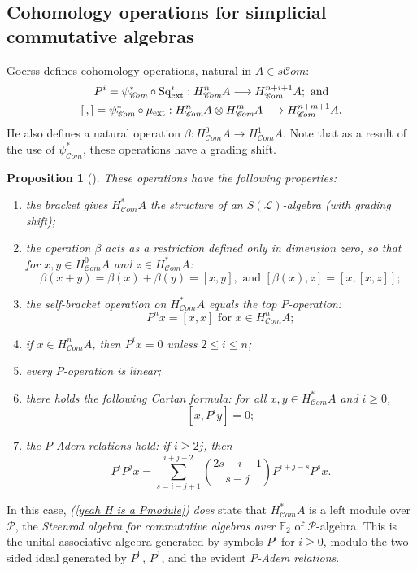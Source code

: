 \documentclass[11pt]{amsart} \renewcommand{\baselinestretch}{1.2}
\theoremstyle{plain}
\newtheorem{prop}[thm]{Proposition}
\theoremstyle{definition}
\renewcommand{\to}{\longrightarrow}
\newcommand{\scrL}{\mathscr{L}}
\newcommand{\scrC}{\mathscr{C}}
\newcommand{\calP}{\mathcal{P}}
\newcommand{\citeBOX}[2][]{\cite[\mbox{#1}]{#2}}
\newcommand{\Palg}{{\calP}}
\newcommand{\LieOperad}{{\scrL}}
\newcommand{\ExtCohOp}{\mathrm{Sq}_\mathrm{ext}}
\newcommand{\ExtCohProd}{\mu_\mathrm{ext}}
\newcommand{\F}{\mathbb{F}}
\newcommand{\algs}{{\scrC\!\textit{om}}}
\newcommand{\Ftwo}{\F_2}
\begin{document}
\begin{Constructing cohomology operations}
\subsection{Cohomology operations for simplicial commutative algebras}
\label{The example of simplicial commutative F2-algebras}
Goerss \citeBOX[\S5]{MR1089001} defines cohomology operations, natural in $A\in s \algs$:
\begin{gather*}
P^i=\psi^*_{\algs}\circ\ExtCohOp^i:H^n_{\algs}A\to H_{\algs}^{n+i+1}A;\textup{ and}\\
[\,,]=\psi^*_{\algs}\circ\ExtCohProd :H_{\algs}^nA\otimes H_{\algs}^mA\to H_{\algs}^{n+m+1}A.
\end{gather*}
He also defines a natural operation $\beta:H_{\algs}^0A\to H_{\algs}^1A$. Note that as a result of the use of $\psi^*_{\algs}$, these operations have a grading shift.
\begin{prop}[{\citeBOX[\S5]{MR1089001}}]
\label{omnibus on coh of simp algs}These operations have the following properties:
\begin{enumerate}
\item the bracket gives $H^*_{\algs}A$ the structure of an $S(\LieOperad)$-algebra (with grading shift);
\item the operation $\beta$ acts as a restriction defined only in dimension zero, so that for $x,y\in H^0_{\algs}A$ and $z\in H^*_{\algs}A$:
\[\beta(x+y)=\beta(x)+\beta(y)=[x,y],\text{\ \ and \ }[\beta(x),z]=[x,[x,z]];\]
\item the self-bracket operation on $H^*_{\algs}A$ equals the \emph{top $P$-operation}:
\[P^nx=[x,x]\text{\ \ for $x\in H^n_{\algs}A$};\]
\item \label{P unstable vanishing} if $x\in H^n_{\algs}A$, then $P^ix=0$ unless $2\leq i\leq n$;
\item every $P$-operation is linear;
\item there holds the following \emph{Cartan formula}:  for all $x,y\in   H^*_{\algs}A$ and $i\geq0$,
\[[x,P^iy]=0;\]
\item \label{yeah H is a Pmodule}the \emph{$P$-Adem relations} hold: if $i\geq 2j$, then
\[P^iP^jx=\sum_{s=i-j+1}^{i+j-2}{2s-i-1\choose s-j}P^{i+j-s}P^sx.\]
\end{enumerate}
\end{prop}
In this case, \emph{(\ref{yeah H is a Pmodule})} \emph{does} state that $H^*_{\algs}A$ is a left module over $\Palg$, the \emph{Steenrod algebra for commutative algebras over $\Ftwo $} of $\Palg$-algebra. This is the unital associative algebra generated by symbols $P^i$ for $i\geq0$, modulo the two sided ideal generated by $P^0$, $P^1$, and the evident \emph{$P$-Adem relations}.



\end{Constructing cohomology operations}
\end{document}
